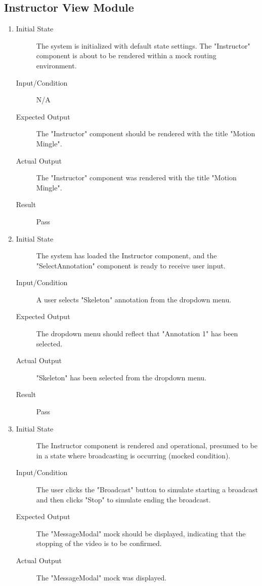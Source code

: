 \documentclass[12pt, titlepage]{article}
\begin{document}
\subsection{Instructor View Module}
\begin{enumerate}[UT-M1]
  \item \label{UT-M1}
    \begin{description}
    \item[Initial State] The system is initialized with default state settings. The "Instructor" component is about to be rendered within a mock routing environment.
    \item[Input/Condition] N/A
    \item[Expected Output] The "Instructor" component should be rendered with the title "Motion Mingle".
    \item[Actual Output] The "Instructor" component was rendered with the title "Motion Mingle".
    \item[Result] Pass
    \end{description}
  \item \label{UT-M2}
    \begin{description}
    \item[Initial State] The system has loaded the Instructor component, and the "SelectAnnotation" component is ready to receive user input.
    \item[Input/Condition] A user selects "Skeleton" annotation from the dropdown menu.
    \item[Expected Output] The dropdown menu should reflect that "Annotation 1" has been selected.
    \item[Actual Output] "Skeleton" has been selected from the dropdown menu.
    \item[Result] Pass
    \end{description}
  \item \label{UT-M3}
    \begin{description}
    \item[Initial State] The Instructor component is rendered and operational, presumed to be in a state where broadcasting is occurring (mocked condition).
    \item[Input/Condition] The user clicks the "Broadcast" button to simulate starting a broadcast and then clicks "Stop" to simulate ending the broadcast.
    \item[Expected Output] The "MessageModal" mock should be displayed, indicating that the stopping of the video is to be confirmed.
    \item[Actual Output] The "MessageModal" mock was displayed.

\end{description}
\end{enumerate}
\end{document}
